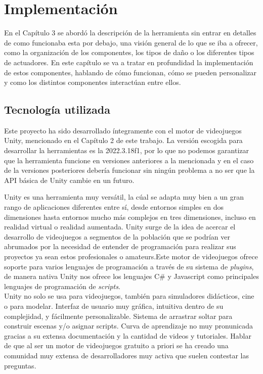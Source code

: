 \setcounter{secnumdepth}{3} %
\chapter{Implementaci\'on}
\label{cap:implementacion}
En el Capítulo 3 se abordó la descripción de la herramienta sin entrar en detalles de como funcionaba esta por debajo, una visión general de lo que se iba a ofrecer, como la organización de los componentes, los tipos de daño o los diferentes tipos de actuadores. En este capítulo se va a tratar en profundidad la implementación de estos componentes, hablando de cómo funcionan, cómo se pueden personalizar y como los distintos componentes interactúan entre ellos.


\section{Tecnología utilizada}
Este proyecto ha sido desarrollado íntegramente con el motor de videojuegos Unity, mencionado en el Capítulo 2 de este trabajo.
La versión escogida para desarrollar la herramientas es la 2022.3.18f1, por lo que no podemos garantizar que la herramienta funcione en versiones anteriores a la mencionada y en el caso de la versiones posteriores debería funcionar sin ningún problema a no ser que la API básica de Unity cambie en un futuro.\\

Unity es una herramienta muy versátil, la cúal se adapta muy bien a un gran rango de aplicaciones diferentes entre sí, desde entornos simples en dos dimensiones hasta entornos mucho más complejos en tres dimensiones, incluso en realidad virtual o realidad aumentada.
Unity surge de la idea de acercar el desarrollo de videojuegos a segmentos de la población que se podrían ver abrumados por la necesidad de entender de programación para realizar sus proyectos ya sean estos profesionales o amateurs.Este motor de videojuegos ofrece soporte para varios lenguajes de programación a través de su sistema de \textit{plugins}, de manera nativa Unity nos ofrece los lenguajes C\# y Javascript como principales lenguajes de programación de \textit{scripts}.\\

Unity no solo se usa para videojuegos, también para simuladores didácticos, cine o para modelar.
Interfaz de usuario muy gráfica, intuitiva dentro de su complejidad, y fácilmente personalizable.
Sistema de arrastrar soltar para construir escenas y/o asignar scripts.
Curva de aprendizaje no muy pronunicada gracias a su extensa documentación y la cantidad de videos y tutoriales.
Hablar de que al ser un motor de videojuegos gratuito a priori se ha creado una comunidad muy extensa de desarrolladores muy activa que suelen contestar las preguntas.\\


